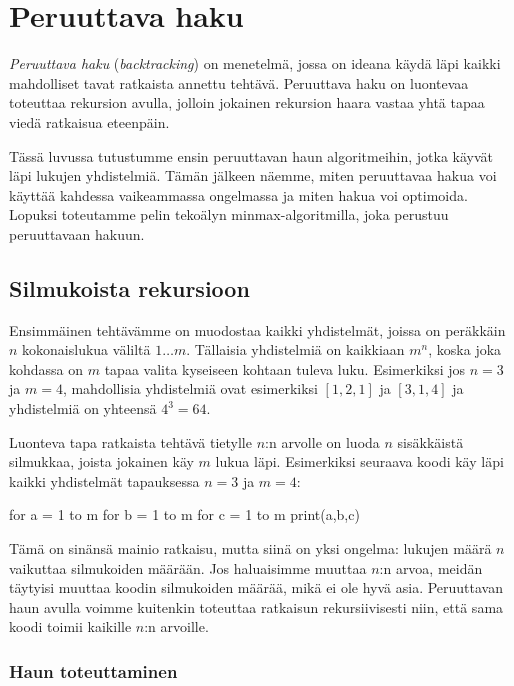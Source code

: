 \chapter{Peruuttava haku}

\emph{Peruuttava haku} (\emph{backtracking}) on menetelmä,
jossa on ideana käydä läpi kaikki mahdolliset tavat 
ratkaista annettu tehtävä.
Peruuttava haku on luontevaa toteuttaa rekursion avulla,
jolloin jokainen rekursion haara vastaa yhtä tapaa
viedä ratkaisua eteenpäin.

Tässä luvussa tutustumme ensin peruuttavan haun algoritmeihin,
jotka käyvät läpi lukujen yhdistelmiä.
Tämän jälkeen näemme, miten peruuttavaa hakua voi käyttää
kahdessa vaikeammassa ongelmassa ja miten hakua voi optimoida.
Lopuksi toteutamme pelin tekoälyn minmax-algoritmilla,
joka perustuu peruuttavaan hakuun.

\section{Silmukoista rekursioon}

Ensimmäinen tehtävämme on muodostaa kaikki yhdistelmät,
joissa on peräk\-käin $n$ kokonaislukua väliltä $1 \dots m$.
Tällaisia yhdistelmiä on kaikkiaan $m^n$,
koska joka kohdassa on $m$ tapaa valita kyseiseen kohtaan tuleva luku.
Esimerkiksi jos $n=3$ ja $m=4$, mahdollisia yhdistelmiä
ovat esimerkiksi $[1,2,1]$ ja $[3,1,4]$
ja yhdistelmiä on yhteensä $4^3=64$.

Luonteva tapa ratkaista tehtävä tietylle $n$:n arvolle on
luoda $n$ sisäkkäistä silmukkaa, joista jokainen käy $m$ lukua läpi.
Esimerkiksi seuraava koodi käy läpi kaikki yhdistelmät
tapauksessa $n=3$ ja $m=4$:

\begin{code}
for a = 1 to m
    for b = 1 to m
        for c = 1 to m
            print(a,b,c)
\end{code}

Tämä on sinänsä mainio ratkaisu, mutta siinä on yksi ongelma:
lukujen määrä $n$ vaikuttaa silmukoiden määrään.
Jos haluaisimme muuttaa $n$:n arvoa, meidän täytyisi muuttaa
koodin silmukoiden määrää, mikä ei ole hyvä asia.
Peruuttavan haun avulla voimme kuitenkin toteuttaa ratkaisun
rekursiivisesti niin, että sama koodi toimii kaikille $n$:n arvoille.

\subsection{Haun toteuttaminen}

